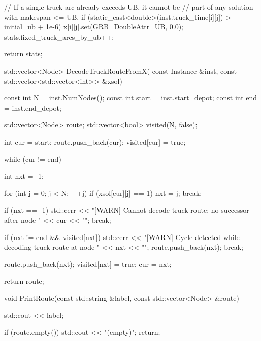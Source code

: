{{{{{{                        // If a single truck arc already exceeds UB, it cannot be
                        // part of any solution with makespan <= UB.
                        if (static_cast<double>(inst.truck_time[i][j]) > initial_ub + 1e-6)
                        {
                            x[i][j].set(GRB_DoubleAttr_UB, 0.0);
                            stats.fixed_truck_arcs_by_ub++;
                        }
                    }
                }
            }

            return stats;
        }

        std::vector<Node> DecodeTruckRouteFromX(
            const Instance &inst,
            const std::vector<std::vector<int>> &xsol)
        {
            const int N = inst.NumNodes();
            const int start = inst.start_depot;
            const int end = inst.end_depot;

            std::vector<Node> route;
            std::vector<bool> visited(N, false);

            int cur = start;
            route.push_back(cur);
            visited[cur] = true;

            while (cur != end)
            {
                int nxt = -1;

                for (int j = 0; j < N; ++j)
                {
                    if (xsol[cur][j] == 1)
                    {
                        nxt = j;
                        break;
                    }
                }

                if (nxt == -1)
                {
                    std::cerr << "[WARN] Cannot decode truck route: no successor after node "
                              << cur << "\n";
                    break;
                }

                if (nxt != end && visited[nxt])
                {
                    std::cerr << "[WARN] Cycle detected while decoding truck route at node "
                              << nxt << "\n";
                    route.push_back(nxt);
                    break;
                }

                route.push_back(nxt);
                visited[nxt] = true;
                cur = nxt;
            }

            return route;
        }

        void PrintRoute(const std::string &label, const std::vector<Node> &route)
        {
            std::cout << label;

            if (route.empty())
            {
                std::cout << "(empty)\n";
                return;
            }

}}}

